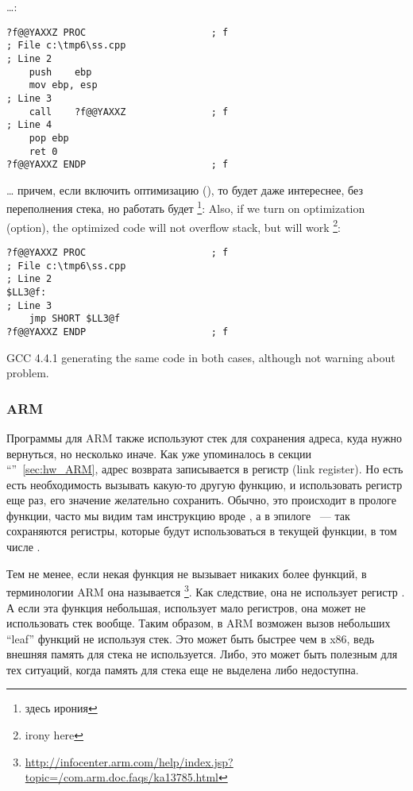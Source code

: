 \dots {}:

\begin{lstlisting}
?f@@YAXXZ PROC						; f
; File c:\tmp6\ss.cpp
; Line 2
	push	ebp
	mov	ebp, esp
; Line 3
	call	?f@@YAXXZ				; f
; Line 4
	pop	ebp
	ret	0
?f@@YAXXZ ENDP						; f
\end{lstlisting}

\dots \IFRU
{причем, если включить оптимизацию (\Ox), то будет даже интереснее, без переполнения стека, 
но работать будет \footnote{здесь ирония}:}
{Also, if we turn on optimization (\Ox option), the optimized code will not overflow stack, 
but will work \footnote{irony here}:}

\begin{lstlisting}
?f@@YAXXZ PROC						; f
; File c:\tmp6\ss.cpp
; Line 2
$LL3@f:
; Line 3
	jmp	SHORT $LL3@f
?f@@YAXXZ ENDP						; f
\end{lstlisting}

{GCC 4.4.1 generating the same code in both cases, although not warning about problem.}

\subsubsection{ARM}

Программы для ARM также используют стек для сохранения адреса, куда нужно вернуться, но несколько иначе.
Как уже упоминалось в секции ``\HelloWorldSectionName''~\ref{sec:hw_ARM}, адрес возврата записывается в регистр \LR 
(link register). Но есть есть необходимость вызывать какую-то другую функцию, и использовать регистр \LR еще
раз, его значение желательно сохранить. Обычно, это происходит в прологе функции, часто мы видим там инструкцию
вроде , а в эпилоге  ~--- так сохраняются регистры, которые будут
использоваться в текущей функции, в том числе \LR.

Тем не менее, если некая функция не вызывает никаких более функций, в терминологии ARM она называется 
\footnote{\url{http://infocenter.arm.com/help/index.jsp?topic=/com.arm.doc.faqs/ka13785.html}}. Как следствие, она не использует регистр \LR. 
А если эта функция небольшая, использует мало регистров, она может не использовать стек вообще. 
Таким образом, в ARM возможен вызов небольших ``leaf'' функций не используя стек. 
Это может быть быстрее чем в x86, ведь внешняя память для стека не используется. 
Либо, это может быть полезным для тех ситуаций, когда память для стека еще не выделена либо недоступна.

